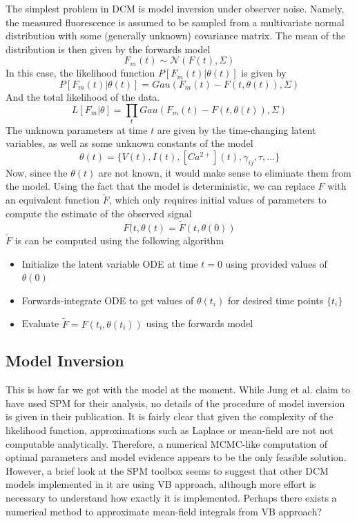 \documentclass[a4paper,10pt]{article}
\begin{document}
The simplest problem in DCM is model inversion under observer noise. Namely, the measured fluorescence is assumed to be sampled from a multivariate normal distribution with some (generally unknown) covariance matrix. The mean of the distribution is then given by the forwards model
\begin{equation}
   F_m(t) \sim \mathcal{N}(F(t), \Sigma)
\end{equation}
In this case, the likelihood function $P[F_m(t) | \theta(t)]$ is given by
\begin{equation}
   P[F_m(t) | \theta(t)] = Gau(F_m(t) - F(t, \theta(t)), \Sigma)
\end{equation}
And the total likelihood of the data.
\begin{equation}
   L[F_m | \theta] = \prod_t Gau(F_m(t) - F(t, \theta(t)), \Sigma)
\end{equation}
The unknown parameters at time $t$ are given by the time-changing latent variables, as well as some unknown constants of the model
\begin{equation}
   \theta(t) = \{V(t), I(t), [Ca^{2+}](t), \gamma_{ij}, \tau, ...\}
\end{equation}
Now, since the $\theta(t)$ are not known, it would make sense to eliminate them from the model. Using the fact that the model is deterministic, we can replace $F$ with an equivalent function $\tilde{F}$, which only requires initial values of parameters to compute the estimate of the observed signal
\begin{equation}
   F(t, \theta(t) = \tilde{F}(t, \theta(0))
\end{equation}
$\tilde{F}$ is can be computed using the following algorithm
\begin{itemize}
  \item Initialize the latent variable ODE at time $t=0$ using provided values of $\theta(0)$
  \item Forwards-integrate ODE to get values of $\theta(t_i)$ for desired time points $\{t_i\}$
  \item Evaluate $\tilde{F} = F(t_i, \theta(t_i))$ using the forwards model 
\end{itemize}

\subsection{Model Inversion}

This is how far we got with the model at the moment. While Jung et al. \cite{jung_dynamic_2019} claim to have used SPM for their analysis, no details of the procedure of model inversion is given in their publication. It is fairly clear that given the complexity of the likelihood function, approximations such as Laplace or mean-field are not not computable analytically. Therefore, a numerical MCMC-like computation of optimal parameters and model evidence appears to be the only feasible solution. However, a brief look at the SPM toolbox seems to suggest that other DCM models implemented in it are using VB approach, although more effort is necessary to understand how exactly it is implemented. Perhaps there exists a numerical method to approximate mean-field integrals from VB approach?
\end{document}
